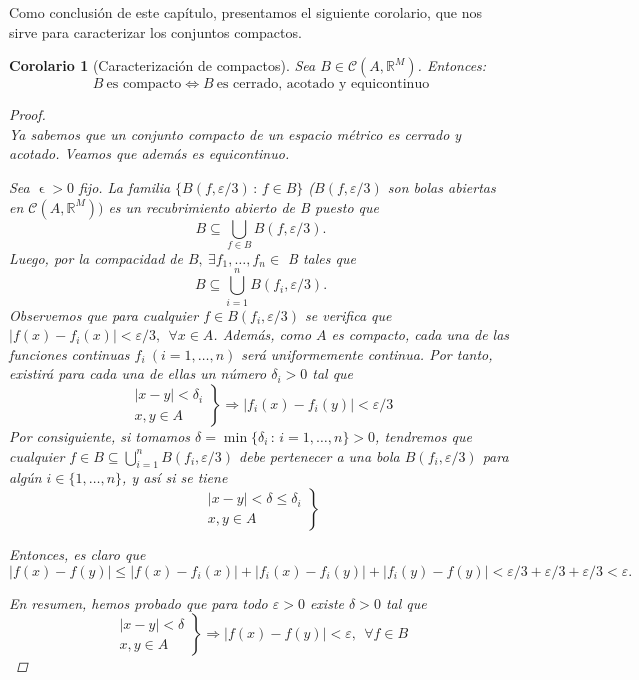 \documentclass[11pt, a4paper]{article}
\let\epsilon\upvarepsilon
\theoremstyle{theorem-style}
\newtheorem{ncor}{Corolario}[section]
\theoremstyle{definition-style}
\theoremstyle{remark-style}
\theoremstyle{example-style}
\begin{document}
Como conclusión de este capítulo, presentamos el siguiente corolario, que nos sirve para caracterizar los conjuntos compactos.

\begin{ncor}[Caracterización de compactos] Sea $B \in \mathcal{C}(A,\mathbb{R}^M)$. Entonces: $$B\ \text{es compacto} \iff B \ \text{es cerrado, acotado y equicontinuo}$$

  \begin{proof} \hfill \\
    \boxed{\Rightarrow} Ya sabemos que un conjunto compacto de un espacio métrico es cerrado y acotado. Veamos que además es equicontinuo.
    
    Sea $\epsilon >0$ fijo. La familia $\{ B(f, \varepsilon/3) \, : \, f\in B\}$ ($B(f, \varepsilon/3)$ son bolas abiertas en $\mathcal{C}(A, \mathbb{R}^M))$ es un recubrimiento abierto de B puesto que $$B\subseteq \bigcup_{f\in B} B(f, \varepsilon/3).$$
    Luego, por la compacidad de $B,\ \exists f_1, \dots, f_n \in$ B tales que $$B \subseteq \displaystyle \bigcup_{i=1}^n B(f_i, \varepsilon/3).$$
    Observemos que para cualquier $f\in B(f_i, \varepsilon/3)$ se verifica que
    $|f(x)-f_i(x)| < \varepsilon/3 , \ \ \forall x\in A$. Además, como $A$ es compacto, cada una de las funciones continuas $f_i \ (i=1,\dots,n)$ será uniformemente continua. Por tanto, existirá para cada una de ellas un número $\delta_i>0$ tal que $$\left. \begin{array}{c} |x-y|<\delta_i \\ x,y\in A \end{array}  \right\} \Rightarrow |f_i(x)-f_i(y)| <\varepsilon/3$$
    Por consiguiente, si tomamos $\delta = \min \{\delta_i \, :\, i=1,\dots,n\} >0$, tendremos que cualquier $f\in B \subseteq \bigcup_{i=1}^n B(f_i, \varepsilon/3)$ debe pertenecer a una bola $B(f_i, \varepsilon/3)$ para algún $i\in\{1,\dots ,n\}$, y así si se tiene $$\left. \begin{array}{c} |x-y|<\delta \leq \delta_i \\ x,y\in A \end{array}  \right\}$$ 

    Entonces, es claro que $\displaystyle |f(x)-f(y)| \le |f(x)-f_i(x)|+|f_i(x)-f_i(y)|+|f_i(y)-f(y)| < \varepsilon/3+\varepsilon/3+\varepsilon/3<\varepsilon.$

    En resumen, hemos probado que para todo $\varepsilon >0$ existe $\delta >0$ tal que $$ \left. \begin{array}{c} |x-y|<\delta  \\ x,y\in A \end{array}  \right\} \Rightarrow |f(x)-f(y)| <\varepsilon , \ \ \forall f\in B$$


\end{proof}
\end{ncor}
\end{document}
